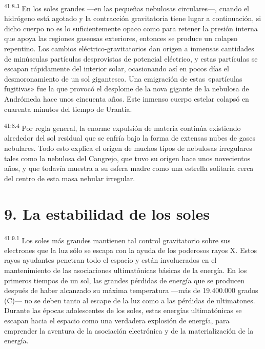 \par
\textsuperscript{41:8.3} En los soles grandes ---en las pequeñas nebulosas circulares---, cuando el hidrógeno está agotado y la contracción gravitatoria tiene lugar a continuación, si dicho cuerpo no es lo suficientemente opaco como para retener la presión interna que apoya las regiones gaseosas exteriores, entonces se produce un colapso repentino. Los cambios eléctrico-gravitatorios dan origen a inmensas cantidades de minúsculas partículas desprovistas de potencial eléctrico, y estas partículas se escapan rápidamente del interior solar, ocasionando así en pocos días el desmoronamiento de un sol gigantesco. Una emigración de estas «partículas fugitivas» fue la que provocó el desplome de la nova gigante de la nebulosa de Andrómeda hace unos cincuenta años. Este inmenso cuerpo estelar colapsó en cuarenta minutos del tiempo de Urantia.

\par
\textsuperscript{41:8.4} Por regla general, la enorme expulsión de materia continúa existiendo alrededor del sol residual que se enfría bajo la forma de extensas nubes de gases nebulares. Todo esto explica el origen de muchos tipos de nebulosas irregulares tales como la nebulosa del Cangrejo, que tuvo su origen hace unos novecientos años, y que todavía muestra a su esfera madre como una estrella solitaria cerca del centro de esta masa nebular irregular.

\section*{9. La estabilidad de los soles}
\par
\textsuperscript{41:9.1} Los soles más grandes mantienen tal control gravitatorio sobre sus electrones que la luz sólo se escapa con la ayuda de los poderosos rayos X. Estos rayos ayudantes penetran todo el espacio y están involucrados en el mantenimiento de las asociaciones ultimatónicas básicas de la energía. En los primeros tiempos de un sol, las grandes pérdidas de energía que se producen después de haber alcanzado su máxima temperatura ---más de 19.400.000 grados (C)--- no se deben tanto al escape de la luz como a las pérdidas de ultimatones. Durante las épocas adolescentes de los soles, estas energías ultimatónicas se escapan hacia el espacio como una verdadera explosión de energía, para emprender la aventura de la asociación electrónica y de la materialización de la energía.

